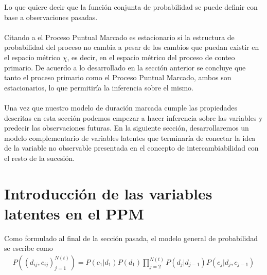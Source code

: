 Lo que quiere decir que la funci\'on conjunta de probabilidad se puede definir con base a observaciones pasadas.\\
\\
Citando a \cite{daley2003} el Proceso Puntual Marcado es estacionario si la estructura de probabilidad del proceso no cambia a pesar de los cambios que puedan existir en el espacio m\'etrico $\chi$, es decir, en el espacio m\'etrico del proceso de conteo primario. De acuerdo a lo desarrollado en la secci\'on anterior se concluye que tanto el proceso primario como el Proceso Puntual Marcado, ambos son estacionarios, lo que permitir\'ia la inferencia sobre el mismo.\\
\\
Una vez que nuestro modelo de duraci\'on marcada cumple las propiedades descritas en esta secci\'on podemos empezar a hacer inferencia sobre las variables y predecir las observaciones futuras. En la siguiente secci\'on, desarrollaremos un modelo complementario de variables latentes que terminar\'ia de conectar la idea de la variable no observable presentada en el concepto de intercambiabilidad con el resto de la sucesi\'on.

\section{Introducci\'on de las variables latentes en el PPM}
Como formulado al final de la secci\'on pasada, el modelo general de probabilidad se escribe como
\begin{align*}
P((d_{ij},c_{ij})_{j=1}^{N(t)})= P(c_1|d_1)P(d_1) \prod_{j=2}^{N(t)} P(d_j|d_{j-1})P(c_j|d_j,c_{j-1})
\end{align*}

